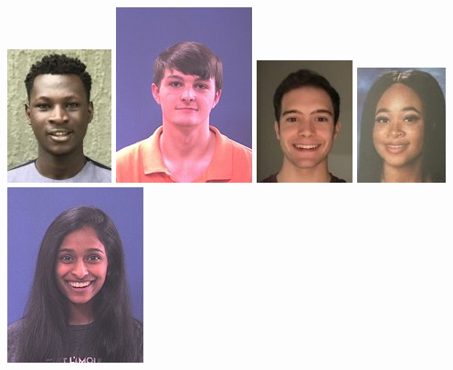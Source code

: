 \documentclass[xcolor={usenames,dvipsnames,svgnames,table},12pt]{beamer}
\begin{document}
\newlength{\photosize}
\setlength{\photosize}{0.45in}
\begin{frame}{}
  \begin{center}
\includegraphics[width=\photosize]{S21/000573252.jpg}
\includegraphics[width=\photosize]{S21/000571408.jpg}
\includegraphics[width=\photosize]{S21/000572541.jpg}
\includegraphics[width=\photosize]{S21/000573733.jpg}
\includegraphics[width=\photosize]{S21/000570739.jpg}

\end{center}
\end{frame}
\end{document}

